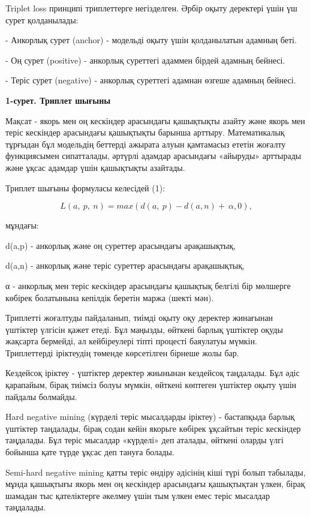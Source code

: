 \begin{multicols}{2}
Triplet loss принципі триплеттерге негізделген. Әрбір оқыту деректері
үшін үш сурет қолданылады:

- Анкорлық сурет (anchor) - модельді оқыту үшін қолданылатын адамның
беті.

- Оң сурет (positive) - анкорлық суреттегі адаммен бірдей адамның
бейнесі.

- Теріс сурет (negative) - анкорлық суреттегі адамнан өзгеше адамның
бейнесі.

{\bfseries 1-сурет. Триплет шығыны}

Мақсат - якорь мен оң кескіндер арасындағы қашықтықты азайту және якорь
мен теріс кескіндер арасындағы қашықтықты барынша арттыру. Математикалық
тұрғыдан бұл модельдің беттерді ажырата алуын қамтамасыз ететін жоғалту
функциясымен сипатталады, әртүрлі адамдар арасындағы «айыруды» арттырады
және ұқсас адамдар үшін қашықтықты азайтады.

Триплет шығыны формуласы келесідей (1):

\begin{equation}
L(a,\ p,\ n) = max(d(a,\ p) - d(a,n) + \ \alpha,0),
\end{equation}

мұндағы:

d(a,p) - анкорлық және оң суреттер арасындағы арақашықтық,

d(a,n) - анкорлық және теріс суреттер арасындағы арақашықтық,

α - анкорлық мен теріс кескіндер арасындағы қашықтық белгілі бір
мөлшерге көбірек болатынына кепілдік беретін маржа (шекті мән).

Триплетті жоғалтуды пайдаланып, тиімді оқыту оқу деректер жинағынан
үштіктер үлгісін қажет етеді. Бұл маңызды, өйткені барлық үштіктер оқуды
жақсарта бермейді, ал кейбіреулері тіпті процесті баяулатуы мүмкін.
Триплеттерді іріктеудің төменде көрсетілген бірнеше жолы бар.

Кездейсоқ іріктеу - үштіктер деректер жиынынан кездейсоқ таңдалады. Бұл
әдіс қарапайым, бірақ тиімсіз болуы мүмкін, өйткені көптеген үштіктер
оқыту үшін пайдалы болмайды.

Hard negative mining (күрделі теріс мысалдарды іріктеу) - бастапқыда
барлық үштіктер таңдалады, бірақ содан кейін якорьге көбірек ұқсайтын
теріс кескіндер таңдалады. Бұл теріс мысалдар «күрделі» деп аталады,
өйткені оларды үлгі бойынша қате түрде ұқсас деп тануға болады.

Semi-hard negative mining қатты теріс өндіру әдісінің кіші түрі болып
табылады, мұнда қашықтығы якорь мен оң кескіндер арасындағы қашықтықтан
үлкен, бірақ шамадан тыс қателіктерге әкелмеу үшін тым үлкен емес теріс
мысалдар таңдалады.


\end{multicols}
